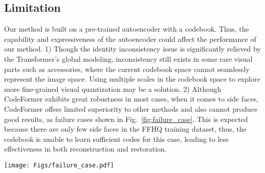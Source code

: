 \subsection{Limitation}
\label{sec:limitation}
Our method is built on a pre-trained autoencoder with a codebook. Thus, the capability and expressiveness of the autoencoder could affect the performance of our method. 1) Though the identity inconsistency issue is significantly relieved by the Transformer's global modeling, inconsistency still exists in some rare visual parts such as accessories, where the current codebook space cannot seamlessly represent the image space. Using multiple scales in the codebook space to explore more fine-grained visual quantization may be a solution. 2) Although CodeFormer exhibits great robustness in most cases, when it comes to side faces, CodeFormer offers limited superiority to other methods and also cannot produce good results, as failure cases shown in Fig.~\ref{fig:failure_case}. This is expected because there are only few side faces in the FFHQ training dataset, thus, the codebook is unable to learn sufficient codes for this case, leading to less effectiveness in both reconstruction and restoration. 


\begin{figure*}[ht]
\centering
	\texttt{[image: Figs/failure\_case.pdf]}
	\vspace{-4mm}
	\caption{Failure cases tend to occur on side faces, which could be caused by the limited number of side face images in the training dataset of FFHQ.}
	\label{fig:failure_case}
	\vspace{-2mm}
\end{figure*}
%